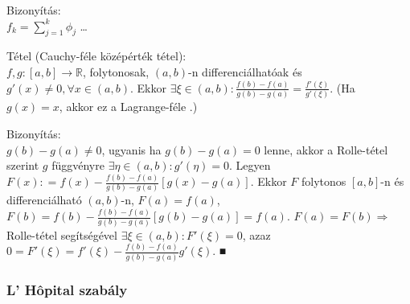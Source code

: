 \documentclass[12pt,a4paper]{scrartcl}
\newenvironment{tetel}{}{}
\newenvironment{bizonyitas}{}{}
\begin{document}
\begin{bizonyitas}

Bizonyítás:\\
\(f_{k} = {\sum\limits_{j = 1}^{k}\phi_{j}}\) \ldots{}

\end{bizonyitas}

\begin{tetel}

Tétel (Cauchy-féle középérték tétel):\\
\(\left. f,g:\left\lbrack {a,b} \right\rbrack\rightarrow{\mathbb{R}} \right.\),
folytonosak, \(\left( {a,b} \right)\)-n differenciálhatóak és
\(g'\left( x \right) \neq 0,\forall x \in \left( {a,b} \right)\). Ekkor
\(\exists\xi \in \left( {a,b} \right):\frac{f\left( b \right) - f\left( a \right)}{g\left( b \right) - g\left( a \right)} = \frac{f'\left( \xi \right)}{g'\left( \xi \right)}\).
(Ha \(g\left( x \right) = x\), akkor ez a Lagrange-féle .)

\end{tetel}

\begin{bizonyitas}

Bizonyítás:\\
\(g\left( b \right) - g\left( a \right) \neq 0\), ugyanis ha
\(g\left( b \right) - g\left( a \right) = 0\) lenne, akkor a Rolle-tétel
szerint \(g\) függvényre
\(\exists\eta \in \left( {a,b} \right):g'\left( \eta \right) = 0\).
Legyen
\(F\left( x \right): = f\left( x \right) - \frac{f\left( b \right) - f\left( a \right)}{g\left( b \right) - g\left( a \right)}\left\lbrack {g\left( x \right) - g\left( a \right)} \right\rbrack\).
Ekkor \(F\) folytonos \(\left\lbrack {a,b} \right\rbrack\)-n és
differenciálható \(\left( {a,b} \right)\)-n,
\(F\left( a \right) = f\left( a \right)\),
\(F\left( b \right) = f\left( b \right) - \frac{f\left( b \right) - f\left( a \right)}{g\left( b \right) - g\left( a \right)}\left\lbrack {g\left( b \right) - g\left( a \right)} \right\rbrack = f\left( a \right)\).
\(\left. F\left( a \right) = F\left( b \right)\Rightarrow \right.\)
Rolle-tétel segítségével
\(\exists\xi \in \left( {a,b} \right):F'\left( \xi \right) = 0\), azaz
\(0 = F'\left( \xi \right) = f'\left( \xi \right) - \frac{f\left( b \right) - f\left( a \right)}{g\left( b \right) - g\left( a \right)}g'\left( \xi \right)\).
■

\end{bizonyitas}

\hypertarget{l-hopital-szabaly}{%
\subsubsection{L' Hôpital szabály}\label{l-hopital-szabaly}}
\end{document}
